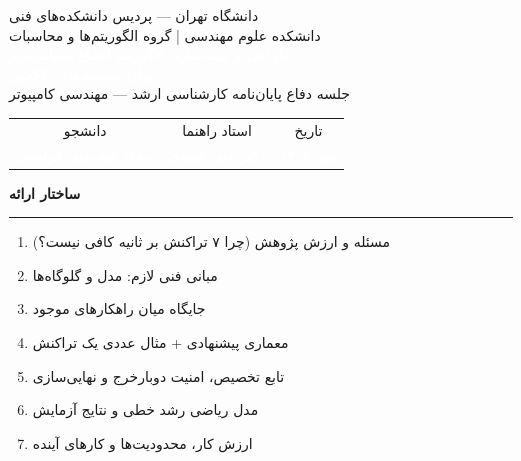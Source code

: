 \documentclass[12pt]{article}
\newcommand{\slidetitle}[1]{%
  \vspace*{-1mm}%
  {\Huge\color{UTnavy}\textbf{#1}}\par
  \vspace{1.5mm}%
  {\color{UTgold}\rule{42mm}{1.6pt}}\par
  \vspace{1.5mm}%
}
\newcommand{\newslide}{\clearpage}
\begin{document}
\thispagestyle{empty}
\vspace*{8mm}
\begin{center}
{\large\textcolor{UTsoft}{دانشگاه تهران — پردیس دانشکده‌های فنی}}\\[2mm]
{\normalsize\textcolor{UTsoft}{دانشکده علوم مهندسی | گروه الگوریتم‌ها و محاسبات}}\\[10mm]
{\Huge\textbf{\textcolor{white}{طراحی و بهینه‌سازی الگوریتم اجماع مقیاس‌پذیر}}}\\[3mm]
{\Huge\textbf{\textcolor{white}{برای سیستم‌های بلاکچین}}}\\[8mm]
{\Large\textcolor{UTgold}{جلسه دفاع پایان‌نامه کارشناسی ارشد — مهندسی کامپیوتر}}\\[12mm]
\begin{tabular}{ccc}
\textcolor{UTgold}{دانشجو} & \textcolor{UTgold}{استاد راهنما} & \textcolor{UTgold}{تاریخ} \\[1mm]
\textbf{\textcolor{white}{سجاد خشدونی فراهانی}} &
\textbf{\textcolor{white}{دکتر علی کمندی}} &
\textbf{\textcolor{white}{مهر ۱۴۰۵}}
\end{tabular}
\end{center}

\newslide
\slidetitle{ساختار ارائه}
{\LARGE
\setlength{\parskip}{0.55em}%
\begin{enumerate}
  \item مسئله و ارزش پژوهش (چرا ۷ تراکنش بر ثانیه کافی نیست؟)
  \item مبانی فنی لازم: مدل  و گلوگاه‌ها
  \item جایگاه میان راهکارهای موجود
  \item معماری پیشنهادی + مثال عددی یک تراکنش
  \item تابع تخصیص، امنیت دوبارخرج و نهایی‌سازی
  \item مدل ریاضی رشد خطی و نتایج آزمایش
  \item ارزش کار، محدودیت‌ها و کارهای آینده
\end{enumerate}
}
\end{document}
